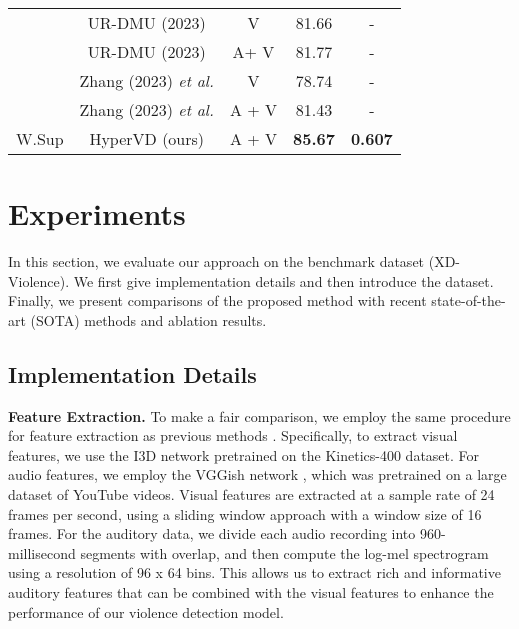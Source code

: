 \documentclass[sigconf]{acmart}
\newcommand{\etal}{{\emph{et al. }}}
\begin{document}
\begin{table}[t]
{\begin{tabular}{c|c|c|c|c}
                        & UR-DMU (2023) \cite{c:10}     &  V       &  81.66           & -     \\
                        & UR-DMU (2023) \cite{c:10}     &  A+ V       &  81.77           & -     \\
                        & Zhang (2023)  \etal\cite{zhang2022exploiting} & V       &  78.74            & -     \\
                        & Zhang (2023) \etal\cite{zhang2022exploiting}  & A + V       &  81.43            & -     \\\hline
\multirow{1}{*}{W.Sup} & HyperVD (ours)                           &  A + V        & \textbf{85.67}   & \textbf{0.607} \\ \hline

\end{tabular}}
\label{table1}
\end{table}

\section{Experiments}
In this section, we evaluate our approach on the benchmark dataset (XD-Violence). We first give implementation details and then introduce the dataset. Finally, we present comparisons of the proposed method with recent state-of-the-art (SOTA) methods and ablation results.






\subsection{Implementation Details}
\noindent\textbf{Feature Extraction.} To make a fair comparison, we employ the same procedure for feature extraction as previous methods \cite{c:1,c:2, pang2021violence,c:4}. Specifically, to extract visual features, we use the I3D network \cite{Carreira_Zisserman_2017} pretrained on the Kinetics-400 dataset. For audio features, we employ the VGGish network \cite{Gemmeke_Ellis, Hershey_Chaudhuri}, which was pretrained on a large dataset of YouTube videos. Visual features are extracted at a sample rate of 24 frames per second, using a sliding window approach with a window size of 16 frames. For the auditory data, we divide each audio recording into 960-millisecond segments with overlap, and then compute the log-mel spectrogram using a resolution of 96 x 64 bins. This allows us to extract rich and informative auditory features that can be combined with the visual features to enhance the performance of our violence detection model.
\end{document}
